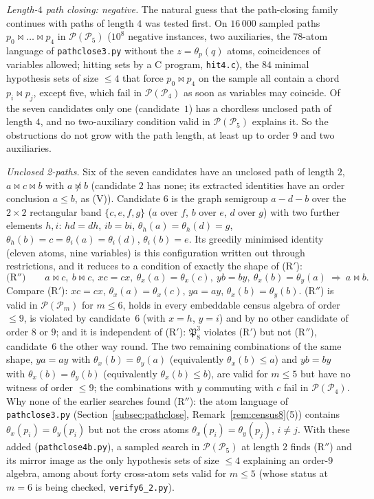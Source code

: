 \documentclass[11pt]{amsart}
\theoremstyle{definition}
\renewcommand{\P}{\mathcal{P}}
\begin{document}
\smallskip
\emph{Length-$4$ path closing: negative.} The natural guess that the path-closing family continues with paths of length $4$ was tested first. On $16\,000$ sampled paths $p_0\bowtie\dots\bowtie p_4$ in $\P(\P_5)$ ($10^8$ negative instances, two auxiliaries, the $78$-atom language of \texttt{pathclose3.py} without the $z=\theta_p(q)$ atoms, coincidences of variables allowed; hitting sets by a C program, \texttt{hit4.c}), the $84$ minimal hypothesis sets of size $\le4$ that force $p_0\bowtie p_4$ on the sample all contain a chord $p_i\bowtie p_j$, except five, which fail in $\P(\P_4)$ as soon as variables may coincide. Of the seven candidates only one (candidate~$1$) has a chordless unclosed path of length $4$, and no two-auxiliary condition valid in $\P(\P_5)$ explains it. So the obstructions do not grow with the path length, at least up to order $9$ and two auxiliaries.

\smallskip
\emph{Unclosed 2-paths.} Six of the seven candidates have an unclosed path of length $2$, $a\bowtie c\bowtie b$ with $a\not\bowtie b$ (candidate $2$ has none; its extracted identities have an order conclusion $a\le b$, as (V)). Candidate $6$ is the graph semigroup $a-d-b$ over the $2\times2$ rectangular band $\{c,e,f,g\}$ ($a$ over $f$, $b$ over $e$, $d$ over $g$) with two further elements $h,i$: $hd=dh$, $ib=bi$, $\theta_h(a)=\theta_h(d)=g$, $\theta_h(b)=c=\theta_i(a)=\theta_i(d)$, $\theta_i(b)=e$. Its greedily minimised identity (eleven atoms, nine variables) is this configuration written out through restrictions, and it reduces to a condition of exactly the shape of (R$'$):
\begin{equation}\label{eq:Rpp}
\text{(R$''$)}\qquad a\bowtie c,\ b\bowtie c,\ xc=cx,\ \theta_x(a)=\theta_x(c),\ yb=by,\ \theta_x(b)=\theta_y(a)\ \Longrightarrow\ a\bowtie b .
\end{equation}
Compare (R$'$): $xc=cx$, $\theta_x(a)=\theta_x(c)$, $ya=ay$, $\theta_x(b)=\theta_y(b)$. (R$''$) is valid in $\P(\P_m)$ for $m\le6$, holds in every embeddable census algebra of order $\le9$, is violated by candidate~$6$ (with $x=h$, $y=i$) and by no other candidate of order $8$ or $9$; and it is independent of (R$'$): $\mathfrak P_8^3$ violates (R$'$) but not (R$''$), candidate~$6$ the other way round. The two remaining combinations of the same shape, $ya=ay$ with $\theta_x(b)=\theta_y(a)$ (equivalently $\theta_x(b)\le a$) and $yb=by$ with $\theta_x(b)=\theta_y(b)$ (equivalently $\theta_x(b)\le b$), are valid for $m\le5$ but have no witness of order $\le9$; the combinations with $y$ commuting with $c$ fail in $\P(\P_4)$. Why none of the earlier searches found (R$''$): the atom language of \texttt{pathclose3.py} (Section~\ref{subsec:pathclose}, Remark~\ref{rem:census8}(5)) contains $\theta_x(p_i)=\theta_y(p_i)$ but not the cross atoms $\theta_x(p_i)=\theta_y(p_j)$, $i\ne j$. With these added (\texttt{pathclose4b.py}), a sampled search in $\P(\P_5)$ at length $2$ finds (R$''$) and its mirror image as the only hypothesis sets of size $\le4$ explaining an order-$9$ algebra, among about forty cross-atom sets valid for $m\le5$ (whose status at $m=6$ is being checked, \texttt{verify6\_2.py}).
\end{document}

